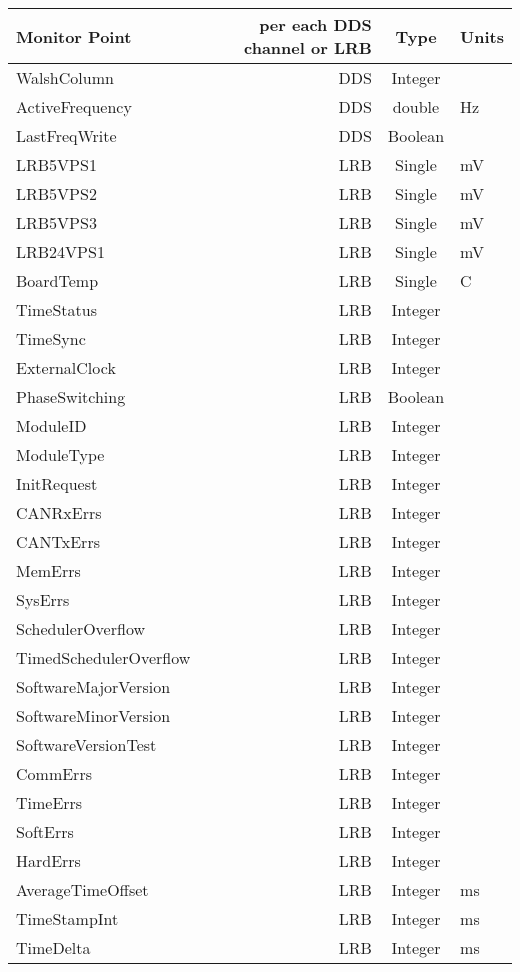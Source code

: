 \documentclass[preprint]{aastex}
\begin{document}
\begin{tabular}{lrcl}
\hline
Monitor Point & per each DDS channel or LRB & Type & Units \\
\hline

WalshColumn             & DDS & Integer & \\
ActiveFrequency         & DDS & double & Hz \\
LastFreqWrite           & DDS & Boolean & \\
LRB5VPS1                & LRB & Single & mV \\
LRB5VPS2                & LRB & Single & mV \\
LRB5VPS3                & LRB & Single & mV \\
LRB24VPS1               & LRB & Single & mV \\
BoardTemp               & LRB & Single & C \\
TimeStatus              & LRB & Integer & \\
TimeSync                & LRB & Integer & \\
ExternalClock           & LRB & Integer & \\
PhaseSwitching          & LRB & Boolean & \\
ModuleID                & LRB & Integer & \\
ModuleType              & LRB & Integer & \\
InitRequest             & LRB & Integer & \\
CANRxErrs               & LRB & Integer & \\
CANTxErrs               & LRB & Integer & \\
MemErrs                 & LRB & Integer & \\
SysErrs                 & LRB & Integer & \\
SchedulerOverflow       & LRB & Integer & \\
TimedSchedulerOverflow  & LRB & Integer & \\
SoftwareMajorVersion    & LRB & Integer & \\
SoftwareMinorVersion    & LRB & Integer & \\
SoftwareVersionTest     & LRB & Integer & \\
CommErrs                & LRB & Integer & \\
TimeErrs                & LRB & Integer & \\
SoftErrs                & LRB & Integer & \\
HardErrs                & LRB & Integer & \\
AverageTimeOffset       & LRB & Integer & ms \\
TimeStampInt            & LRB & Integer & ms \\
TimeDelta               & LRB & Integer & ms \\
\hline
\end{tabular}
\end{document}

